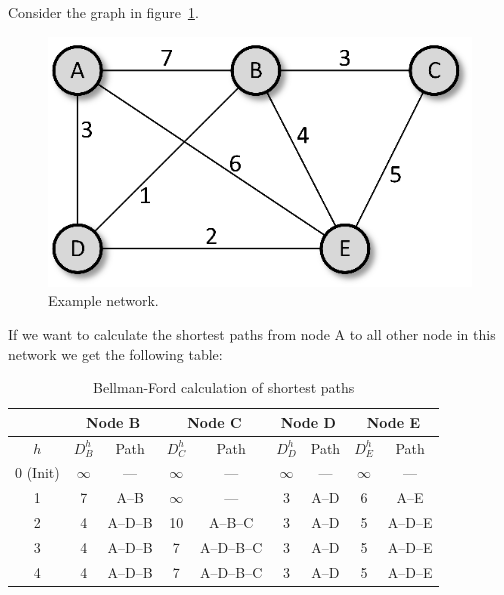 \documentclass[a4paper]{article}
\begin{document}
Consider the graph in figure~\ref{fig:Graphs2}.
\begin{figure}[ht]
\centering\includegraphics{Graphs2.eps}\caption{\label{fig:Graphs2}Example
network.}
\end{figure}

\noindent{}If we want to calculate the shortest paths from node A
to all other node in this network we get the following table:

\begin{table}[ht]
\centering
\begin{tabular}{|c|c|c|c|c|c|c|c|c|}\hline
%
 & \multicolumn{2}{|c|}{Node B} & \multicolumn{2}{|c|}{Node C} & \multicolumn{2}{|c|}{Node D} & \multicolumn{2}{|c|}{Node E} \\ \hline
%
$h$ & $D^{h}_B$ & Path & $D^{h}_C$ & Path & $D^{h}_D$ & Path &
$D^{h}_E$ & Path \\ \hline
%
0 (Init) & $\infty$ & --- & $\infty$ & --- & $\infty$ & --- &
$\infty$ & --- \\ \hline
%
1 & 7 & A--B & $\infty$ & --- & 3 & A--D & 6 & A--E \\
\hline
%
2 & 4 & A--D--B & 10 & A--B--C & 3 & A--D & 5 & A--D--E \\
\hline
%
3 & 4 & A--D--B & 7 & A--D--B--C & 3 & A--D & 5 & A--D--E \\
\hline
%
4 & 4 & A--D--B & 7 & A--D--B--C & 3 & A--D & 5 & A--D--E \\
\hline
\end{tabular}
\caption{Bellman-Ford calculation of shortest paths}
\end{table}
\end{document}
